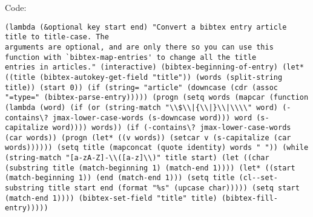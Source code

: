 \documentclass[11pt]{article}
\begin{document}
Code:
\begin{verbatim}
(lambda (&optional key start end) "Convert a bibtex entry article title to title-case. The
arguments are optional, and are only there so you can use this
function with `bibtex-map-entries' to change all the title
entries in articles." (interactive) (bibtex-beginning-of-entry) (let* ((title (bibtex-autokey-get-field "title")) (words (split-string title)) (start 0)) (if (string= "article" (downcase (cdr (assoc "=type=" (bibtex-parse-entry))))) (progn (setq words (mapcar (function (lambda (word) (if (or (string-match "\\$\\|{\\|}\\|\\\\" word) (-contains\? jmax-lower-case-words (s-downcase word))) word (s-capitalize word)))) words)) (if (-contains\? jmax-lower-case-words (car words)) (progn (let* ((v words)) (setcar v (s-capitalize (car words)))))) (setq title (mapconcat (quote identity) words " ")) (while (string-match "[a-zA-Z]-\\([a-z]\\)" title start) (let ((char (substring title (match-beginning 1) (match-end 1)))) (let* ((start (match-beginning 1)) (end (match-end 1))) (setq title (cl--set-substring title start end (format "%s" (upcase char))))) (setq start (match-end 1)))) (bibtex-set-field "title" title) (bibtex-fill-entry)))))
\end{verbatim}
\end{document}
